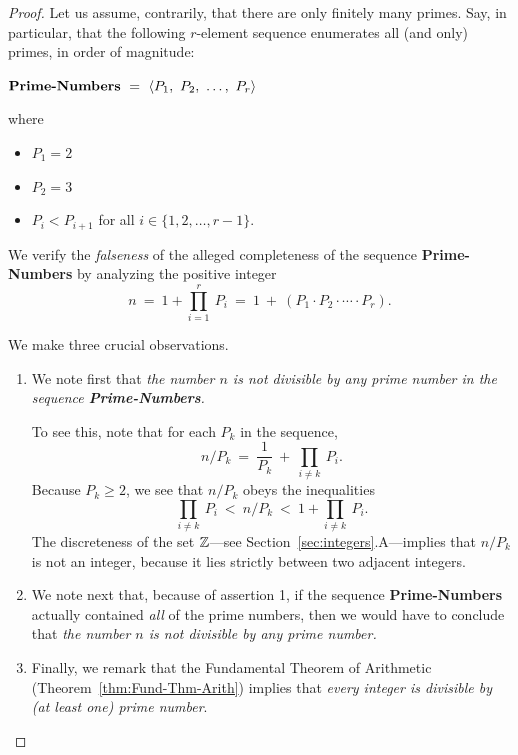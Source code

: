 \begin{proof}
Let us assume, contrarily, that there are only finitely many primes.
Say, in particular, that the following $r$-element sequence enumerates
all (and only) primes, in order of magnitude:

$\mbox{\bf Prime-Numbers} \ = \ 
\langle P_1, \ P_2, \ \ldots, \ P_r \rangle$

\noindent where
\begin{itemize}
\item
$P_1 = 2$
\item
$P_2 = 3$
\item
$P_i < P_{i+1}$ for all $i \in \{1, 2, \ldots, r-1\}$.
\end{itemize}

We verify the {\em falseness} of the alleged completeness of the sequence
{\bf Prime-Numbers} by analyzing the positive integer
\[ n \ = \ 1 + \prod_{i=1}^r \ P_i \ = \ 1 \ + \ 
\left(P_1 \cdot P_2 \cdot \cdots \cdot P_r \right).
\]

We make three crucial observations.

\begin{enumerate}
\item
We note first that {\em the number $n$ is not divisible by any prime
number  in the sequence {\bf Prime-Numbers}.}

To see this, note that for each $P_k$ in the sequence,
\[
n / P_k \ = \ \frac{1}{P_k} \ + \ \prod_{i \neq k} \ P_i .
\]
Because $P_k \geq 2$, we see that $n / P_k$ obeys the inequalities
\[
\prod_{i \neq k} \ P_i \ < \ n/P_k \ < \ 1 + \prod_{i \neq k} \ P_i.
\] 
The discreteness of the set $\mathbb{Z}$---see
Section~\ref{sec:integers}.A---implies that $n / P_k$ is not an
integer, because it lies strictly between two adjacent integers.

\item
We note next that, because of assertion 1, if the sequence {\bf
  Prime-Numbers} actually contained {\em all} of the prime numbers,
then we would have to conclude that {\em the number $n$ is not
  divisible by any prime number.}

\item
Finally, we remark that the Fundamental Theorem of Arithmetic
(Theorem~\ref{thm:Fund-Thm-Arith}) implies that {\em every integer is
  divisible by (at least one) prime number}.
\end{enumerate}


\end{proof}
